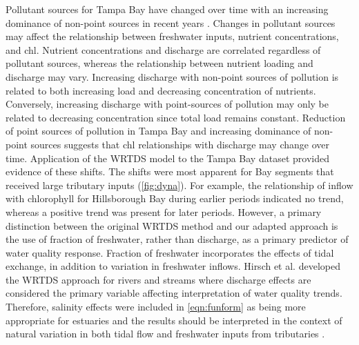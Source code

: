 \documentclass{svjour3}\usepackage[]{graphicx}\usepackage[]{color}
\begin{document}
Pollutant sources for Tampa Bay have changed over time with an increasing dominance of non-point sources in recent years \cite{Pribble01}.  Changes in pollutant sources may affect the relationship between freshwater inputs, nutrient concentrations, and \ac{chl}.  Nutrient concentrations and discharge are correlated regardless of pollutant sources, whereas the relationship between nutrient loading and discharge may vary.  Increasing discharge with non-point sources of pollution is related to both increasing load and decreasing concentration of nutrients.  Conversely, increasing discharge with point-sources of pollution may only be related to decreasing concentration since total load remains constant. Reduction of point sources of pollution in Tampa Bay and increasing dominance of non-point sources suggests that \ac{chl} relationships with discharge may change over time.  Application of the \ac{WRTDS} model to the Tampa Bay dataset provided evidence of these shifts.  The shifts were most apparent for Bay segments that received large tributary inputs (\cref{fig:dyna}). For example, the relationship of inflow with chlorophyll for Hillsborough Bay during earlier periods indicated no trend, whereas a positive trend was present for later periods.  However, a primary distinction between the original \ac{WRTDS} method and our adapted approach is the  use of fraction of freshwater, rather than discharge, as a primary predictor of water quality response.  Fraction of freshwater incorporates the effects of tidal exchange, in addition to variation in freshwater inflows.  Hirsch et al. \cite{Hirsch10} developed the \ac{WRTDS} approach for rivers and streams where discharge effects are considered the primary variable affecting interpretation of water quality trends.  Therefore, salinity effects were included in \cref{eqn:funform} as being more appropriate for estuaries and the results should be interpreted in the context of natural variation in both tidal flow and freshwater inputs from tributaries \cite{Cloern96}.
\end{document}
